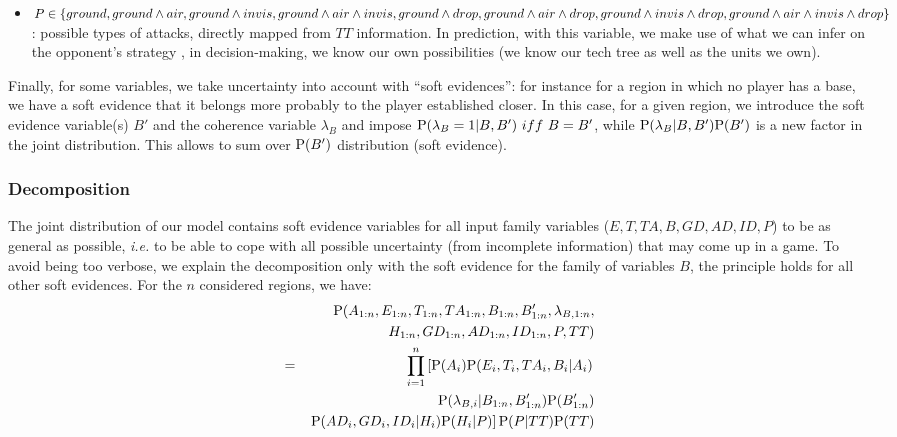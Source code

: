 \begin{itemize}
    \item $P \in \begin{small}\{ground, ground\wedge air, ground\wedge invis, ground\wedge air\wedge invis, ground\wedge drop, ground\wedge air\wedge drop, ground\wedge invis\wedge drop, ground\wedge air\wedge invis\wedge drop\}\end{small}$: possible types of attacks, directly mapped from $TT$ information. In prediction, with this variable, we make use of what we can infer on the opponent's strategy \cite{SYNNAEVE:OpeningPred,SYNNAEVE:StratPred}, in decision-making, we know our own possibilities (we know our tech tree as well as the units we own).
\end{itemize}
Finally, for some variables, we take uncertainty into account with ``soft evidences'': for instance for a region in which no player has a base, we have a soft evidence that it belongs more probably to the player established closer. In this case, for a given region, we introduce the soft evidence variable(s) $B'$ and the coherence variable $\lambda_B$ and impose $\PP(\lambda_B=1|B,B')\ iff\ B=B'$, while $\mathrm{P}(\lambda_B|B,B')\mathrm{P}(B')$ is a new factor in the joint distribution. This allows to sum over $\mathrm{P}(B')$ distribution (soft evidence). 

\subsubsection{Decomposition}
The joint distribution of our model contains soft evidence variables for all input family variables ($E,T,TA,B,GD,AD,ID,P$) to be as general as possible, \textit{i.e.} to be able to cope with all possible uncertainty (from incomplete information) that may come up in a game. To avoid being too verbose, we explain the decomposition only with the soft evidence for the family of variables $B$, the principle holds for all other soft evidences. For the $n$ considered regions, we have:
\begin{eqnarray}
    & & \mathrm{P}(A_{1:n}, E_{1:n}, T_{1:n}, TA_{1:n}, B_{1:n}, B'_{1:n}, \lambda_{B,1:n}, \\
& & H_{1:n}, GD_{1:n}, AD_{1:n}, ID_{1:n}, P, TT) \\
    & = & \prod_{i=1}^n \left[\mathrm{P}(A_i)\mathrm{P}(E_i,T_i,TA_i,B_i|A_i) \label{eqn:tacticsdecomposition}\right.\\
& & \mathrm{P}(\lambda_{B,i} | B_{1:n},B'_{1:n})\mathrm{P}(B'_{1:n}) \\
& & \left. \mathrm{P}(AD_i,GD_i,ID_i|H_i)\mathrm{P}(H_i|P)\right]\mathrm{P}(P|TT)\mathrm{P}(TT)
\end{eqnarray}

